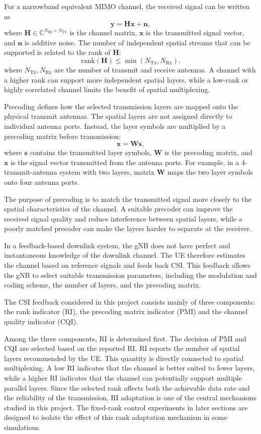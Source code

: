 \documentclass[a4paper,12pt,onecolumn]{article}
\begin{document}
		For a narrowband equivalent MIMO channel, the received signal can be written as
		\[
		\mathbf{y} = \mathbf{H}\mathbf{x} + \mathbf{n},
		\]
		where $
		\mathbf{H} \in \mathbb{C}^{N_{\mathrm{Rx}} \times N_{\mathrm{Tx}}} $ is the channel matrix, \(\mathbf{x}\) is the transmitted signal
		vector, and \(\mathbf{n}\) is additive noise. The number of independent spatial streams
		that can be supported is related to the rank of \(\mathbf{H}\):
		\[
		\mathrm{rank}(\mathbf{H}) \leq \min(N_\mathrm{Tx}, N_\mathrm{Rx}).
		\]
		where $N_\mathrm{Tx}, N_\mathrm{Rx}$ are the number of transmit and receive antennas. A channel with a higher rank can support more independent spatial layers, while a low-rank or highly correlated channel limits the benefit of spatial multiplexing.

		Precoding defines how the selected transmission layers are mapped onto the physical transmit antennas. The spatial layers are not assigned directly to individual antenna ports. Instead, the layer symbols are multiplied by a precoding matrix before transmission:
		\[
		\mathbf{x} = \mathbf{W}\mathbf{s},
		\]
		where \(\mathbf{s}\) contains the transmitted layer symbols, \(\mathbf{W}\) is the
		precoding matrix, and \(\mathbf{x}\) is the signal vector transmitted from the antenna ports. For example, in a 4-transmit-antenna system with two layers, matrix \(\mathbf{W}\) maps the two layer symbols onto four antenna ports.
		
		The purpose of precoding is to match the transmitted signal more closely to
		the spatial characteristics of the channel. A suitable precoder can improve the received signal quality and reduce interference between spatial layers, while a poorly matched precoder can make the layers harder to separate at the receiver. 
	
		In a feedback-based downlink system, the gNB does not have perfect and instantaneous knowledge of the downlink channel. The UE therefore estimates
		the channel based on reference signals and feeds back CSI. This feedback allows the gNB to select suitable transmission parameters, including the modulation and coding scheme, the number of layers, and the
		precoding matrix.

		The CSI feedback considered in this project consists mainly of three components:  the rank indicator (RI), the precoding matrix indicator (PMI) and the channel quality indicator (CQI). 
		
		Among the three components, RI is determined first. The decision of PMI and CQI are selected based on the reported RI. RI reports the number of spatial layers recommended by the UE. This quantity is directly connected to spatial multiplexing. A low RI indicates that the channel is better suited to fewer layers, while a higher RI indicates that the channel can potentially support multiple parallel layers. Since the selected rank affects both the achievable data rate and the reliability of the transmission, RI adaptation is one of the central mechanisms studied in this project. The fixed-rank control experiments in later sections are designed to isolate the effect of this rank adaptation mechanism in some simulations.
\end{document}
